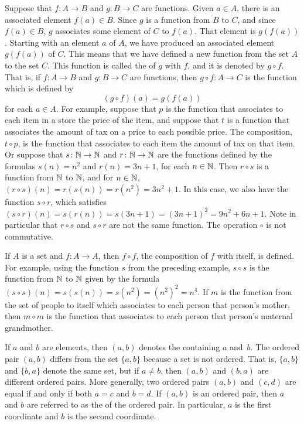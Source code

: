 Suppose that $f\colon A\to B$ and $g\colon B\to C$ are functions.
Given $a\in A$, there is an associated element $f(a)\in B$.
Since $g$ is a function from $B$ to $C$, and since $f(a)\in B$,
$g$ associates some element of $C$ to $f(a)$.
That element is $g(f(a))$.
Starting with an element $a$ of $A$, we have produced an associated element $g(f(a))$ of $C$.
This means that we have defined a new function from the set $A$ to the set $C$.
This function is called the  of $g$ with $f$, and it is denoted by $g\circ f$.  
That is, if $f\colon A\to B$ and $g\colon B\to C$ are functions, then $g\circ f\colon A\to C$ is the function which is defined by 
\[(g\circ f)(a) = g(f(a))\]
for each $a\in A$.  For example, suppose that $p$ is the function
that associates to each item in a store the price of the item,
and suppose that $t$ is a function that associates the amount of
tax on a price to each possible price.  The composition,
$t\circ p$, is the function that associates to each item the
amount of tax on that item.  Or suppose that 
$s\colon{\mathbb N}\to{\mathbb N}$ and $r\colon{\mathbb N}\to{\mathbb N}$ are the functions
defined by the formulas $s(n)=n^2$ and $r(n)=3n+1$, for each
$n\in{\mathbb N}$.  Then $r\circ s$ is a function from ${\mathbb N}$ to ${\mathbb N}$,
and for $n\in{\mathbb N}$, $(r\circ s)(n) = r(s(n)) = r(n^2) = 3n^2+1$.
In this case, we also have the function $s\circ r$, which 
satisfies $(s\circ r)(n) = s(r(n)) = s(3n+1) = (3n+1)^2 = 9n^2+6n+1$.
Note in particular that $r\circ s$ and $s\circ r$ are not
the same function.  The operation $\circ$ is not commutative.

If $A$ is a set and $f\colon A\to A$, then $f\circ f$,
the composition of $f$ with itself, is defined.  For example,
using the function $s$ from the preceding example,
$s\circ s$ is the function from ${\mathbb N}$ to ${\mathbb N}$ given by
the formula $(s\circ s)(n) = s(s(n))= s(n^2) = (n^2)^2 = n^4$.
If $m$ is the function from the set of people to itself which
associates to each person that person's mother, then
$m\circ m$ is the function that associates to each person
that person's maternal grandmother.


\medbreak

If $a$ and $b$ are elements, then $(a,b)$ denotes the
 containing $a$ and~$b$.  The ordered pair
$(a,b)$ differs from the set $\{a,b\}$ because a set is
not ordered.  That is, $\{a,b\}$ and $\{b,a\}$ denote the
same set, but if $a\not=b$, then $(a,b)$ and $(b,a)$ are
different ordered pairs.  More generally, two
ordered pairs $(a,b)$ and $(c,d)$ are equal if and only if
both $a=c$ and $b=d$.  If $(a,b)$ is an ordered pair,
then $a$ and $b$ are referred to as the  of the
ordered pair.  In particular, $a$ is the first coordinate and
$b$ is the second coordinate.

